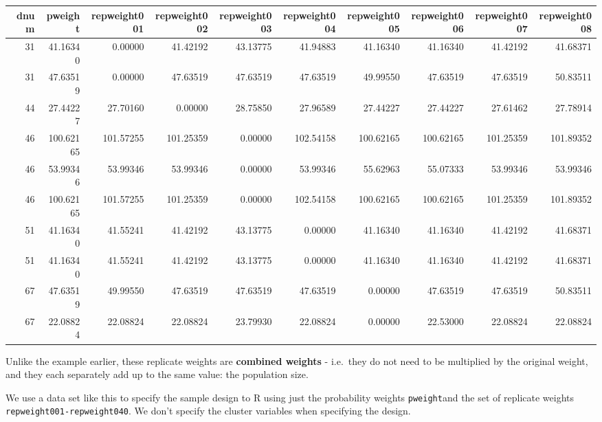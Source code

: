 \documentclass[
]{book}
\begin{document}
\begin{table}
\centering
\begin{tabular}[t]{r|r|r|r|r|r|r|r|r|r}
\hline
dnum & pweight & repweight001 & repweight002 & repweight003 & repweight004 & repweight005 & repweight006 & repweight007 & repweight008\\
\hline
31 & 41.16340 & 0.00000 & 41.42192 & 43.13775 & 41.94883 & 41.16340 & 41.16340 & 41.42192 & 41.68371\\
\hline
31 & 47.63519 & 0.00000 & 47.63519 & 47.63519 & 47.63519 & 49.99550 & 47.63519 & 47.63519 & 50.83511\\
\hline
44 & 27.44227 & 27.70160 & 0.00000 & 28.75850 & 27.96589 & 27.44227 & 27.44227 & 27.61462 & 27.78914\\
\hline
46 & 100.62165 & 101.57255 & 101.25359 & 0.00000 & 102.54158 & 100.62165 & 100.62165 & 101.25359 & 101.89352\\
\hline
46 & 53.99346 & 53.99346 & 53.99346 & 0.00000 & 53.99346 & 55.62963 & 55.07333 & 53.99346 & 53.99346\\
\hline
46 & 100.62165 & 101.57255 & 101.25359 & 0.00000 & 102.54158 & 100.62165 & 100.62165 & 101.25359 & 101.89352\\
\hline
51 & 41.16340 & 41.55241 & 41.42192 & 43.13775 & 0.00000 & 41.16340 & 41.16340 & 41.42192 & 41.68371\\
\hline
51 & 41.16340 & 41.55241 & 41.42192 & 43.13775 & 0.00000 & 41.16340 & 41.16340 & 41.42192 & 41.68371\\
\hline
67 & 47.63519 & 49.99550 & 47.63519 & 47.63519 & 47.63519 & 0.00000 & 47.63519 & 47.63519 & 50.83511\\
\hline
67 & 22.08824 & 22.08824 & 22.08824 & 23.79930 & 22.08824 & 0.00000 & 22.53000 & 22.08824 & 22.08824\\
\hline
\end{tabular}
\end{table}

Unlike the example earlier, these replicate weights are \textbf{combined weights} -
i.e.~they do not need to be multiplied by the original weight, and they
each separately add up to the same value: the population size.

We use a data set like this to specify the sample design to R using just
the probability weights \texttt{pweight}and the set of replicate weights \texttt{repweight001-repweight040}.
We don't specify the cluster variables when specifying the design.
\end{document}
